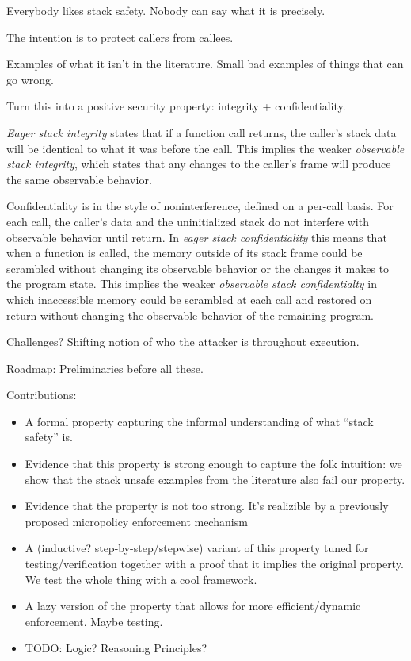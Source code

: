 \documentclass[acmsmall,review,anonymous]{acmart}\settopmatter{printfolios=true,printccs=false,printacmref=false}
\begin{document}
Everybody likes stack safety. Nobody can say what it is precisely.

The intention is to protect callers from callees.

Examples of what it isn't in the literature.
Small bad examples of things that can go wrong.

Turn this into a positive security property: integrity + confidentiality.

    {\it Eager stack integrity} states that if a function call returns, the caller's stack data
    will be identical to what it was before the call. This implies the weaker {\it observable
    stack integrity}, which states that any changes to the caller's frame will produce the same
    observable behavior.

    Confidentiality is in the style of noninterference, defined on a per-call basis. For each call,
    the caller's data and the uninitialized stack do not interfere with observable behavior until return.
    In {\it eager stack confidentiality} this means that when a function is called, the memory outside of
    its stack frame could be scrambled without changing its observable behavior or the changes it makes
    to the program state. This implies the weaker {\it observable stack confidentialty} in which
    inaccessible memory could be scrambled at each call and restored on return without changing the
    observable behavior of the remaining program.

Challenges?
Shifting notion of who the attacker is throughout execution.

Roadmap: 
Preliminaries before all these.

Contributions:
\begin{itemize}
\item A formal property capturing the informal understanding of what ``stack safety'' is.
\item Evidence that this property is strong enough to capture the folk
intuition: we show that the stack
  unsafe examples from the literature also fail our property.
\item Evidence that the property is not too strong. It's realizible by
  a previously proposed  micropolicy enforcement mechanism 
\item A (inductive? step-by-step/stepwise) variant of this property
  tuned for testing/verification together with a proof that it implies
  the original property.  We test the whole thing with a cool
  framework.
\item A lazy version of the property that allows for more efficient/dynamic enforcement.
  Maybe testing.
\item TODO: Logic? Reasoning Principles?
\end{itemize}
\end{document}
